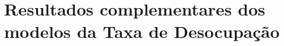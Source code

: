 \documentclass[rbe,wwwview]{econbr}
\begin{document}

\clearpage
\appendix
\section{Resultados complementares dos modelos da Taxa de Desocupação}

\vspace{-0.2cm}

\vspace{-0.3cm}

\vspace{-0.2cm}

\vspace{-0.3cm}

\vspace{-0.2cm}

\vspace{-0.3cm}

\vspace{-0.2cm}

\vspace{-0.3cm}

\vspace{-0.2cm}

\vspace{-0.3cm}
\end{document}
